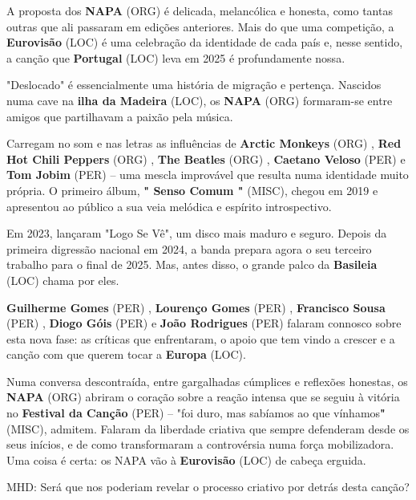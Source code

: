 \documentclass[12pt,a4paper]{article}
\begin{document}
A proposta dos \textbf{NAPA} (ORG) é delicada, melancólica e honesta, como tantas outras que ali passaram em edições anteriores. Mais do que uma competição, a \textbf{Eurovisão} (LOC) é uma celebração da identidade de cada país e, nesse sentido, a canção que \textbf{Portugal} (LOC) leva em 2025 é profundamente nossa.



"Deslocado" é essencialmente uma história de migração e pertença. Nascidos numa cave na \textbf{ilha da Madeira} (LOC), os \textbf{NAPA} (ORG) formaram-se entre amigos que partilhavam a paixão pela música.



Carregam no som e nas letras as influências de \textbf{Arctic Monkeys} (ORG) , \textbf{Red Hot Chili Peppers} (ORG) , \textbf{The Beatles} (ORG) , \textbf{Caetano Veloso} (PER) e \textbf{Tom Jobim} (PER) -- uma mescla improvável que resulta numa identidade muito própria. O primeiro álbum, \textbf{" Senso Comum "} (MISC), chegou em 2019 e apresentou ao público a sua veia melódica e espírito introspectivo.



Em 2023, lançaram "Logo Se Vê", um disco mais maduro e seguro. Depois da primeira digressão nacional em 2024, a banda prepara agora o seu terceiro trabalho para o final de 2025. Mas, antes disso, o grande palco da \textbf{Basileia} (LOC) chama por eles.



\textbf{Guilherme Gomes} (PER) , \textbf{Lourenço Gomes} (PER) , \textbf{Francisco Sousa} (PER) , \textbf{Diogo Góis} (PER) e \textbf{João Rodrigues} (PER) falaram connosco sobre esta nova fase: as críticas que enfrentaram, o apoio que tem vindo a crescer e a canção com que querem tocar a \textbf{Europa} (LOC).



Numa conversa descontraída, entre gargalhadas cúmplices e reflexões honestas, os \textbf{NAPA} (ORG) abriram o coração sobre a reação intensa que se seguiu à vitória no \textbf{Festival da Canção} (PER) -- "foi duro, mas sabíamos ao que vínhamos\textbf{"} (MISC), admitem. Falaram da liberdade criativa que sempre defenderam desde os seus inícios, e de como transformaram a controvérsia numa força mobilizadora. Uma coisa é certa: os NAPA vão à \textbf{Eurovisão} (LOC) de cabeça erguida.



MHD: Será que nos poderiam revelar o processo criativo por detrás desta canção?
\end{document}
